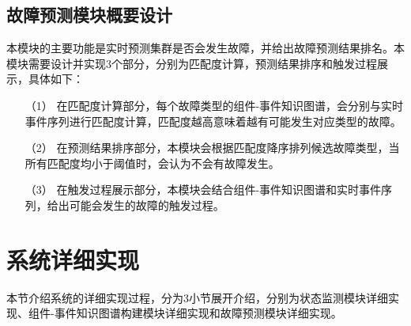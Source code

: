 \subsection{故障预测模块概要设计}
本模块的主要功能是实时预测集群是否会发生故障，并给出故障预测结果排名。本模块需要设计并实现3个部分，分别为匹配度计算，预测结果排序和触发过程展示，具体如下：
\begin{itemize}
    \item [（1）]在匹配度计算部分，每个故障类型的组件-事件知识图谱，会分别与实时事件序列进行匹配度计算，匹配度越高意味着越有可能发生对应类型的故障。
    \item [（2）]在预测结果排序部分，本模块会根据匹配度降序排列候选故障类型，当所有匹配度均小于阈值时，会认为不会有故障发生。
    \item [（3）]在触发过程展示部分，本模块会结合组件-事件知识图谱和实时事件序列，给出可能会发生的故障的触发过程。
\end{itemize}
\section{系统详细实现}
本节介绍系统的详细实现过程，分为3小节展开介绍，分别为状态监测模块详细实现、组件-事件知识图谱构建模块详细实现和故障预测模块详细实现。

